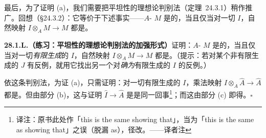 最后，为了证明 (a)，我们需要把平坦性的理想论判别法（\mbox{定理~24.3.1}）稍作推广。回想（\S24.3.2）：它等价于下述事实——$A$-\trModule{} $M$ 是\trFlat{}的，当且仅当对一切\trIdeal{} $I$，自然映射 $I\otimes_A M\to M$ 都是\trInjectiveMap。

\textbf{28.1.L.（练习：平坦性的理想论判别法的加强形式）}\quad 证明：$A$-\trModule{} $M$ 是\trFlat{}的，当且仅当对一切\emph{有限生成}的\trIdeal{} $I$，自然映射 $I\otimes_A M\to M$ 都是\trInjectiveMap。（提示：若对某个非有限生成的\trIdeal{} $J$ 有反例，就用它找出另一个对\emph{确为}有限生成的\trIdeal{} $I$ 的反例。）

依这条判别法，为证 (a)，只需证明：对一切有限生成的\trIdeal{} $I$，乘法映射 $I\otimes_A\hat{A}\to\hat{A}$ 都是\trInjectiveMap。但由部分 (b)，这与证明 $\hat{I}\to\hat{A}$ 是\trInjectiveMap 是同一回事\footnote{译注：原书此处作「this is the same showing that」，当为「this is the same as showing that」之误（脱漏 as），径改。——译者注}；而这由部分 (c) 即得。\hfill$\square$
